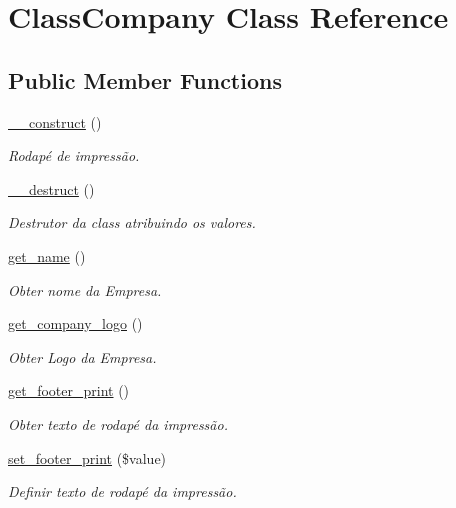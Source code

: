 \hypertarget{class_class_company}{}\section{Class\+Company Class Reference}
\label{class_class_company}
\subsection*{Public Member Functions}
\begin{DoxyCompactItemize}
\item 
\hyperlink{class_class_company_a095c5d389db211932136b53f25f39685}{\+\_\+\+\_\+construct} ()
\begin{DoxyCompactList}\small\item\em Rodapé de impressão. \end{DoxyCompactList}\item 
\hyperlink{class_class_company_a421831a265621325e1fdd19aace0c758}{\+\_\+\+\_\+destruct} ()
\begin{DoxyCompactList}\small\item\em Destrutor da class atribuindo os valores. \end{DoxyCompactList}\item 
\hyperlink{class_class_company_a4f1149ccbd69d1ac4225b7bc2dd871bb}{get\+\_\+name} ()
\begin{DoxyCompactList}\small\item\em Obter nome da Empresa. \end{DoxyCompactList}\item 
\hyperlink{class_class_company_ad4563c95e8eb9b9728663cf81f67156d}{get\+\_\+company\+\_\+logo} ()
\begin{DoxyCompactList}\small\item\em Obter Logo da Empresa. \end{DoxyCompactList}\item 
\hyperlink{class_class_company_a9e4139240e682431b7c0dc4c2b642cea}{get\+\_\+footer\+\_\+print} ()
\begin{DoxyCompactList}\small\item\em Obter texto de rodapé da impressão. \end{DoxyCompactList}\item 
\hyperlink{class_class_company_acab5f801a524d772516bd8632dd54cc7}{set\+\_\+footer\+\_\+print} (\$value)
\begin{DoxyCompactList}\small\item\em Definir texto de rodapé da impressão. \end{DoxyCompactList}\end{DoxyCompactItemize}



